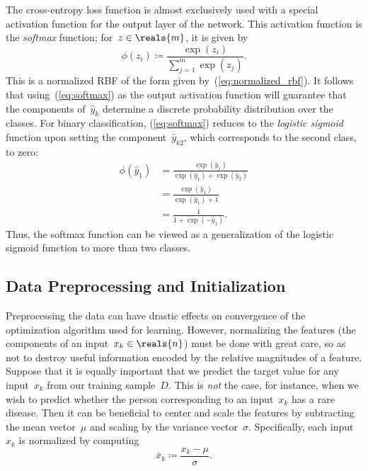 \documentclass[11pt,a4paper]{article}
\numberwithin{equation}{section}
\begin{document}
The cross-entropy loss function is almost exclusively used with a special
activation function for the output layer of the network. This activation
function is the \emph{softmax} function; for~$z \in \reals{m}$, it is given by
\begin{equation}
	\phi(z_i) \coloneqq \frac{\exp(z_i)}{\sum_{j = 1}^m \exp(z_j)}.
	\label{eq:softmax}
\end{equation}
This is a normalized RBF of the form given by~(\ref{eq:normalized_rbf}). It
follows that using~(\ref{eq:softmax}) as the output activation function will
guarantee that the components of~$\hat{y}_k$ determine a discrete probability
distribution over the classes. For binary classification, (\ref{eq:softmax})
reduces to the \emph{logistic sigmoid} function upon setting the
component~$\hat{y}_{k2}$, which corresponds to the second class, to zero:
\begin{align*}
	\phi(\hat{y}_1)
	&= \frac{\exp(\hat{y}_1)}{\exp(\hat{y}_1) + \exp(\hat{y}_2)} \\
	&= \frac{\exp(\hat{y}_1)}{\exp(\hat{y}_1) + 1} \\
	&= \frac{1}{1 + \exp(-\hat{y}_1)}.
\end{align*}
Thus, the softmax function can be viewed as a generalization of the logistic
sigmoid function to more than two classes.

\subsection{Data Preprocessing and Initialization}
\label{sec:pp_and_init}

Preprocessing the data can have drastic effects on convergence of the
optimization algorithm used for learning. However, normalizing the features (the
components of an input~$x_k \in \reals{n}$) must be done with great care, so as
not to destroy useful information encoded by the relative magnitudes of a
feature. Suppose that it is equally important that we predict the target value
for any input~$x_k$ from our training sample~$D$. This is \emph{not} the case,
for instance, when we wish to predict whether the person corresponding to an
input~$x_k$ has a rare disease. Then it can be beneficial to center and scale
the features by subtracting the mean vector~$\mu$ and scaling by the variance
vector~$\sigma$. Specifically, each input~$x_k$ is normalized by computing
\begin{equation}
	\bar{x}_k \coloneqq \frac{x_k - \mu}{\sigma}.
	\label{eq:center_and_scale}
\end{equation}
\end{document}
